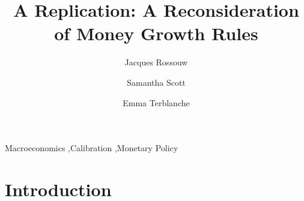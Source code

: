 \documentclass[11pt,preprint, authoryear]{elsarticle}
\numberwithin{equation}{section}
\numberwithin{figure}{section}
\numberwithin{table}{section}
\begin{document}
\begin{frontmatter}  %

\title{A Replication: A Reconsideration of Money Growth Rules}





\author[Add1]{Jacques Rossouw}

\author[Add1]{Samantha Scott}

\author[Add1,Add2]{Emma Terblanche}



\address[Add1]{Stellenbosch University, Cape Town, South Africa}



\vspace{1cm}


\begin{keyword}
\footnotesize{
Macroeconomics \sep Calibration \sep Monetary Policy \\
\vspace{0.3cm}
}
\end{keyword}



\vspace{0.5cm}

\end{frontmatter}



\pagestyle{fancy}
\chead{}
\rhead{}
\lfoot{}
\lhead{}
\cfoot{}


\headsep 35pt %




\newpage

\hypertarget{introduction}{%
\section{Introduction}\label{introduction}}
\end{document}
